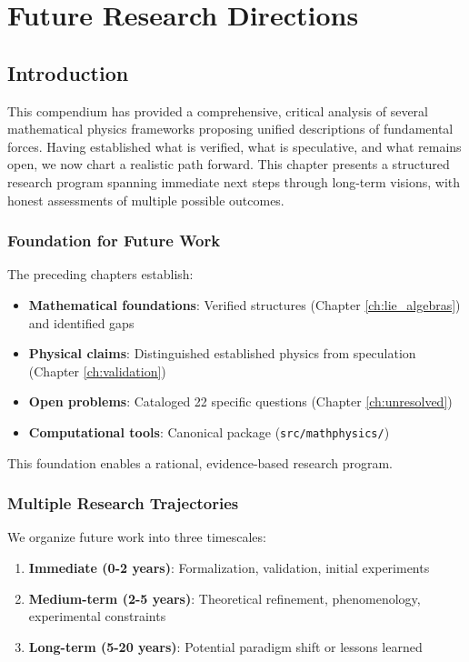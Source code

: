 
\chapter{Future Research Directions}
\label{ch:future}

\section{Introduction}

This compendium has provided a comprehensive, critical analysis of several mathematical physics frameworks proposing unified descriptions of fundamental forces. Having established what is verified, what is speculative, and what remains open, we now chart a realistic path forward. This chapter presents a structured research program spanning immediate next steps through long-term visions, with honest assessments of multiple possible outcomes.

\subsection{Foundation for Future Work}

The preceding chapters establish:
\begin{itemize}
    \item \textbf{Mathematical foundations}: Verified structures (Chapter \ref{ch:lie_algebras}) and identified gaps
    \item \textbf{Physical claims}: Distinguished established physics from speculation (Chapter \ref{ch:validation})
    \item \textbf{Open problems}: Cataloged 22 specific questions (Chapter \ref{ch:unresolved})
    \item \textbf{Computational tools}: Canonical package (\texttt{src/mathphysics/})
\end{itemize}

This foundation enables a rational, evidence-based research program.

\subsection{Multiple Research Trajectories}

We organize future work into three timescales:
\begin{enumerate}
    \item \textbf{Immediate (0-2 years)}: Formalization, validation, initial experiments
    \item \textbf{Medium-term (2-5 years)}: Theoretical refinement, phenomenology, experimental constraints
    \item \textbf{Long-term (5-20 years)}: Potential paradigm shift or lessons learned
\end{enumerate}

